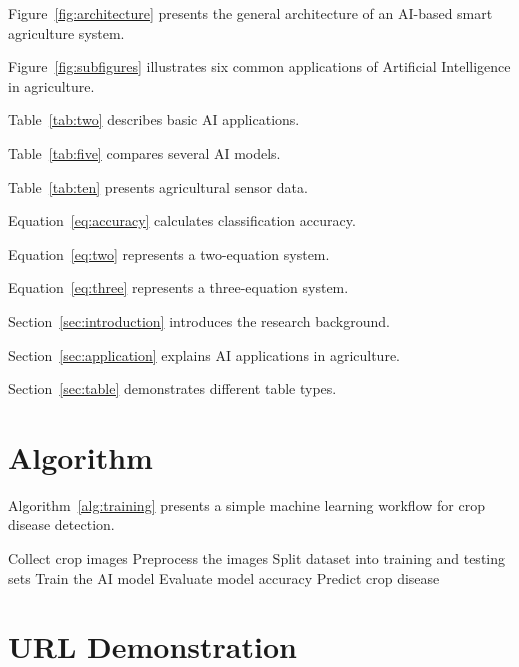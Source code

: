\documentclass[pdflatex,sn-mathphys-num]{sn-jnl}%
\theoremstyle{thmstyleone}%
\theoremstyle{thmstyletwo}%
\theoremstyle{thmstylethree}%
\begin{document}
Figure~\ref{fig:architecture} presents the general architecture of an AI-based smart agriculture system.

Figure~\ref{fig:subfigures} illustrates six common applications of Artificial Intelligence in agriculture.

Table~\ref{tab:two} describes basic AI applications.

Table~\ref{tab:five} compares several AI models.

Table~\ref{tab:ten} presents agricultural sensor data.

Equation~\ref{eq:accuracy} calculates classification accuracy.

Equation~\ref{eq:two} represents a two-equation system.

Equation~\ref{eq:three} represents a three-equation system.

Section~\ref{sec:introduction} introduces the research background.

Section~\ref{sec:application} explains AI applications in agriculture.

Section~\ref{sec:table} demonstrates different table types.

\section{Algorithm}

Algorithm~\ref{alg:training} presents a simple machine learning workflow for crop disease detection.

\begin{algorithm}[H]
\caption{Crop Disease Detection}
\label{alg:training}

\begin{algorithmic}[1]

\State Collect crop images
\State Preprocess the images
\State Split dataset into training and testing sets
\State Train the AI model
\State Evaluate model accuracy
\State Predict crop disease

\end{algorithmic}

\end{algorithm}


\section{URL Demonstration}
\end{document}
